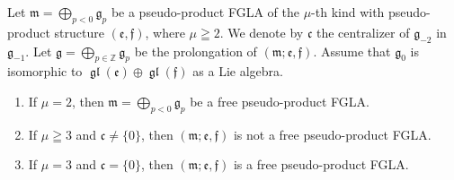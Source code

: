 \documentclass[pdftex]{sigma}
\numberwithin{equation}{section}
\numberwithin{theorem}{section}
\numberwithin{proposition}{section}
\numberwithin{lemma}{section}
\numberwithin{corollary}{section}
\numberwithin{definition}{section}
\numberwithin{example}{section}
\numberwithin{remark}{section}
\numberwithin{note}{section}
\newcommand{\gl}{\operatorname{\mathfrak{gl}}}
\newcommand{\gla}[1]{\mathfrak#1=\bigoplus\limits_{p\in\mathbb Z}\mathfrak#1_p} \renewcommand{\labelenumi}{{\rm (\arabic{enumi})}}
\begin{document}
\begin{proposition}\label{prop8.4}
Let $\mathfrak m=\bigoplus\limits_{p<0}\mathfrak g_p$ be a
pseudo-product FGLA of the $\mu$-th kind with
pseudo-product structure $(\mathfrak e,\mathfrak f)$, where $\mu\geqq2$.
We denote by $\mathfrak c$
the centralizer of $\mathfrak g_{-2}$ in $\mathfrak g_{-1}$.
Let $\gla g$ be the prolongation of $(\mathfrak m;\mathfrak e,\mathfrak f)$.
Assume that $\mathfrak g_0$ is isomorphic to $\gl(\mathfrak e)\oplus\gl(\mathfrak f)$ as a Lie algebra.
\begin{enumerate}\itemsep=0pt
\item If $\mu=2$, then $\mathfrak m=\bigoplus\limits_{p<0}\mathfrak g_p$
be a free
pseudo-product FGLA.
\item If $\mu\geqq3$ and $\mathfrak c\ne\{0\}$,
then $(\mathfrak m;\mathfrak e,\mathfrak f)$ is not a free pseudo-product
FGLA.
\item If $\mu=3$ and $\mathfrak c=\{0\}$,
then $(\mathfrak m;\mathfrak e,\mathfrak f)$ is a free pseudo-product
FGLA.
\end{enumerate}
\end{proposition}
\end{document}
